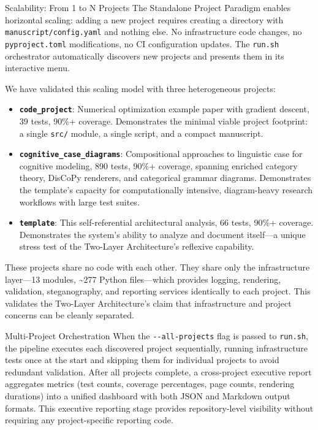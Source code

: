 \documentclass[
  ignorenonframetext,
]{beamer}
\author{\texorpdfstring{}{}}
\date{}
\providecommand{\tightlist}{%
  \setlength{\itemsep}{0pt}\setlength{\parskip}{0pt}}
\begin{document}
\begin{frame}[fragile]{Scalability: From 1 to N Projects}
\protect{}\label{scalability-from-1-to-n-projects}
The Standalone Project Paradigm enables horizontal scaling: adding a new
project requires creating a directory with
\texttt{manuscript/config.yaml} and nothing else. No infrastructure code
changes, no \texttt{pyproject.toml} modifications, no CI configuration
updates. The \texttt{run.sh} orchestrator automatically discovers new
projects and presents them in its interactive menu.

We have validated this scaling model with three heterogeneous projects:

\begin{itemize}
\tightlist
\item
  \textbf{\texttt{code\_project}}: Numerical optimization example paper
  with gradient descent, 39 tests, 90\%+ coverage. Demonstrates the
  minimal viable project footprint: a single \texttt{src/} module, a
  single script, and a compact manuscript.
\item
  \textbf{\texttt{cognitive\_case\_diagrams}}: Compositional approaches
  to linguistic case for cognitive modeling, 890 tests, 90\%+ coverage,
  spanning enriched category theory, DisCoPy renderers, and categorical
  grammar diagrams. Demonstrates the template's capacity for
  computationally intensive, diagram-heavy research workflows with large
  test suites.
\item
  \textbf{\texttt{template}}: This self-referential architectural
  analysis, 66 tests, 90\%+ coverage. Demonstrates the system's ability
  to analyze and document itself---a unique stress test of the Two-Layer
  Architecture's reflexive capability.
\end{itemize}

These projects share no code with each other. They share only the
infrastructure layer---13 modules, \textasciitilde277 Python
files---which provides logging, rendering, validation, steganography,
and reporting services identically to each project. This validates the
Two-Layer Architecture's claim that infrastructure and project concerns
can be cleanly separated.

\begin{block}{Multi-Project Orchestration}
\protect{}\label{multi-project-orchestration}
When the \texttt{-\/-all-projects} flag is passed to \texttt{run.sh},
the pipeline executes each discovered project sequentially, running
infrastructure tests once at the start and skipping them for individual
projects to avoid redundant validation. After all projects complete, a
cross-project executive report aggregates metrics (test counts, coverage
percentages, page counts, rendering durations) into a unified dashboard
with both JSON and Markdown output formats. This executive reporting
stage provides repository-level visibility without requiring any
project-specific reporting code.
\end{block}


\end{frame}
\end{document}
